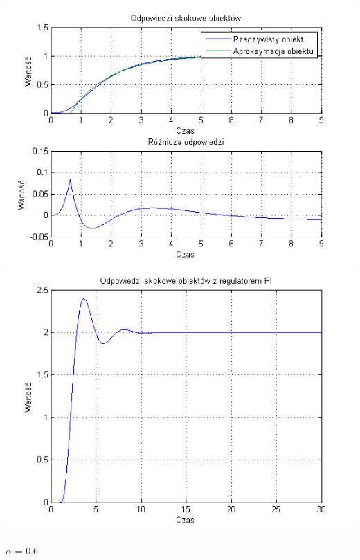 \documentclass[10pt,a4paper]{article}
\begin{document}
\begin{center}
\includegraphics[scale=1]{images/jeden/skrypt_125.png}\\
\includegraphics[scale=1]{images/jeden/skrypt_126.png}\\
\end{center}
\newpage
$\alpha$ = 0.6
\end{document}
